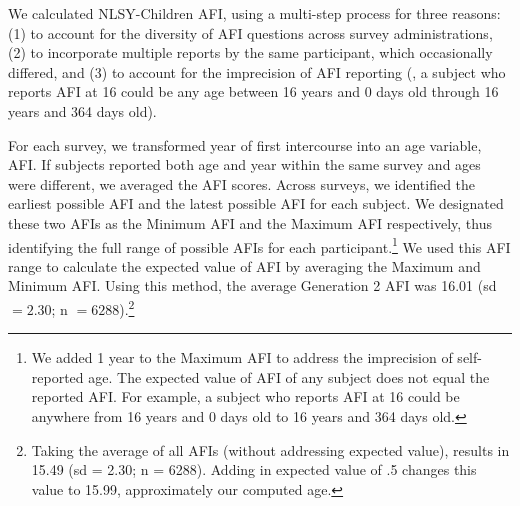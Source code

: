 We calculated NLSY-Children AFI, using a multi-step process for three reasons: (1) to account for the diversity of AFI questions across survey administrations, (2) to incorporate multiple reports by the same participant, which occasionally differed, and (3) to account for the imprecision of AFI reporting (\eg, a subject who reports AFI at 16 could be any age between 16 years and 0 days old through 16 years and 364 days old).

For each survey, we transformed year of first intercourse into an age variable, AFI. If subjects reported both age and year within the same survey and ages were different, we averaged the AFI scores. Across surveys, we identified the earliest possible AFI and the latest possible AFI for each subject. We designated these two AFIs as the Minimum AFI and the Maximum AFI respectively, thus identifying the full range of possible AFIs for each participant.\footnote{We added 1 year to the Maximum AFI to address the imprecision of self-reported age. The expected value of AFI of any subject does not equal the reported AFI. For example, a subject who reports AFI at 16 could be anywhere from 16 years and 0 days old to 16 years and 364 days old.} We used this AFI range to calculate the expected value of AFI by averaging the Maximum and Minimum AFI. Using this method, the average Generation 2 AFI was 16.01 (sd $= 2.30$; n $= 6288$).\footnote{Taking the average of all AFIs (without addressing expected value), results in 15.49 (sd = 2.30; n = 6288). Adding in expected value of .5 changes this value to 15.99, approximately our computed age.}

